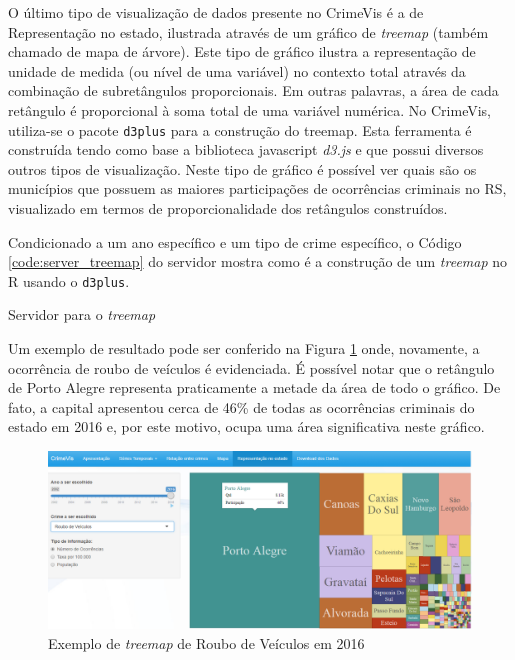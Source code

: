 \documentclass[12pt,openright,oneside,a4paper,english,french,spanish]{abntex2}
\numberwithin{table}{section} %
\numberwithin{figure}{section} %
\begin{document}
O último tipo de visualização de dados presente no CrimeVis é a de Representação no estado, ilustrada através de um gráfico de \textit{treemap} (também chamado de mapa de árvore). Este tipo de gráfico ilustra a representação de unidade de medida (ou nível de uma variável) no contexto total através da combinação de subretângulos proporcionais. Em outras palavras, a área de cada retângulo é proporcional à soma total de uma variável numérica. No CrimeVis, utiliza-se o pacote \texttt{d3plus} para a construção do treemap. Esta ferramenta é construída tendo como base a biblioteca javascript \textit{d3.js} \cite{teller2013data} e que possui diversos outros tipos de visualização. Neste tipo de gráfico é possível ver quais são os municípios que possuem as maiores participações de ocorrências criminais no RS, visualizado em termos de proporcionalidade dos retângulos construídos.

Condicionado a um ano específico e um tipo de crime específico, o Código \ref{code:server_treemap} do servidor mostra como é a construção de um \textit{treemap} no R usando o \texttt{d3plus}.

\begin{rcode}
\begin{Schunk}
\end{Schunk}
\caption{Servidor para o \textit{treemap}}
\label{code:server_treemap}
\end{rcode}

Um exemplo de resultado pode ser conferido na Figura \ref{fig:treemap_ex} onde, novamente, a ocorrência de roubo de veículos é evidenciada. É possível notar que o retângulo de Porto Alegre representa praticamente a metade da área de todo o gráfico. De fato, a capital apresentou cerca de 46\% de todas as ocorrências criminais do estado em 2016 e, por este motivo, ocupa uma área significativa neste gráfico.

\begin{figure}[H]
\centering
\includegraphics[width=.75\linewidth]{exemplo_treemap.png}
\caption{Exemplo de \textit{treemap} de Roubo de Veículos em 2016}
\label{fig:treemap_ex}
\end{figure}
\end{document}
